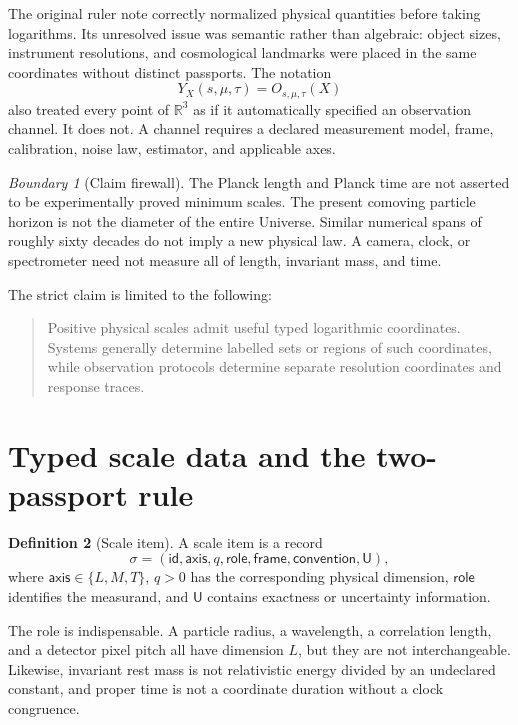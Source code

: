 \documentclass[11pt,a4paper]{article}
\theoremstyle{definition}
\newtheorem{definition}{Definition}[section]
\theoremstyle{plain}
\theoremstyle{remark}
\newtheorem{warning}[definition]{Boundary}
\newcommand{\R}{\mathbb{R}}
\begin{document}
The original ruler note correctly normalized physical quantities before
taking logarithms. Its unresolved issue was semantic rather than
algebraic: object sizes, instrument resolutions, and cosmological
landmarks were placed in the same coordinates without distinct
passports. The notation
\[
  Y_X(s,\mu,\tau)=O_{s,\mu,\tau}(X)
\]
also treated every point of $\R^3$ as if it automatically specified an
observation channel. It does not. A channel requires a declared
measurement model, frame, calibration, noise law, estimator, and
applicable axes.

\begin{warning}[Claim firewall]
The Planck length and Planck time are not asserted to be experimentally
proved minimum scales. The present comoving particle horizon is not the
diameter of the entire Universe. Similar numerical spans of roughly
sixty decades do not imply a new physical law. A camera, clock, or
spectrometer need not measure all of length, invariant mass, and time.
\end{warning}

The strict claim is limited to the following:
\begin{quote}
Positive physical scales admit useful typed logarithmic coordinates.
Systems generally determine labelled sets or regions of such
coordinates, while observation protocols determine separate resolution
coordinates and response traces.
\end{quote}

\section{Typed scale data and the two-passport rule}

\begin{definition}[Scale item]
A scale item is a record
\[
 \sigma=(\mathsf{id},\mathsf{axis},q,\mathsf{role},
         \mathsf{frame},\mathsf{convention},\mathsf U),
\]
where $\mathsf{axis}\in\{L,M,T\}$, $q>0$ has the corresponding physical
dimension, $\mathsf{role}$ identifies the measurand, and $\mathsf U$
contains exactness or uncertainty information.
\end{definition}

The role is indispensable. A particle radius, a wavelength, a correlation
length, and a detector pixel pitch all have dimension $L$, but they are
not interchangeable. Likewise, invariant rest mass is not relativistic
energy divided by an undeclared constant, and proper time is not a
coordinate duration without a clock congruence.
\end{document}
